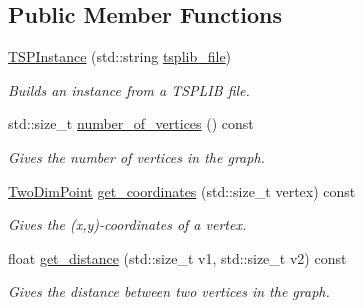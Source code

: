 \subsection*{Public Member Functions}
\begin{DoxyCompactItemize}
\item 
\hyperlink{classas_1_1tsplib_1_1TSPInstance_a5cc9de2e917ae7aa608e10b4375155d6}{T\+S\+P\+Instance} (std\+::string \hyperlink{classas_1_1tsplib_1_1TSPInstance_a6b2d4d7ad5e12825ceee49d32cdc28af}{tsplib\+\_\+file})
\begin{DoxyCompactList}\small\item\em Builds an instance from a T\+S\+P\+L\+IB file. \end{DoxyCompactList}\item 
std\+::size\+\_\+t \hyperlink{classas_1_1tsplib_1_1TSPInstance_a3beae0a769669c417e8bc7d1e41a7550}{number\+\_\+of\+\_\+vertices} () const
\begin{DoxyCompactList}\small\item\em Gives the number of vertices in the graph. \end{DoxyCompactList}\item 
\hyperlink{structas_1_1TwoDimPoint}{Two\+Dim\+Point} \hyperlink{classas_1_1tsplib_1_1TSPInstance_a36962fb85e309faa3efb28fae3b2956b}{get\+\_\+coordinates} (std\+::size\+\_\+t vertex) const
\begin{DoxyCompactList}\small\item\em Gives the (x,y)-\/coordinates of a vertex. \end{DoxyCompactList}\item 
float \hyperlink{classas_1_1tsplib_1_1TSPInstance_a52535b9ad72eaaac80f2a7a1518e680f}{get\+\_\+distance} (std\+::size\+\_\+t v1, std\+::size\+\_\+t v2) const
\begin{DoxyCompactList}\small\item\em Gives the distance between two vertices in the graph. \end{DoxyCompactList}\end{DoxyCompactItemize}
